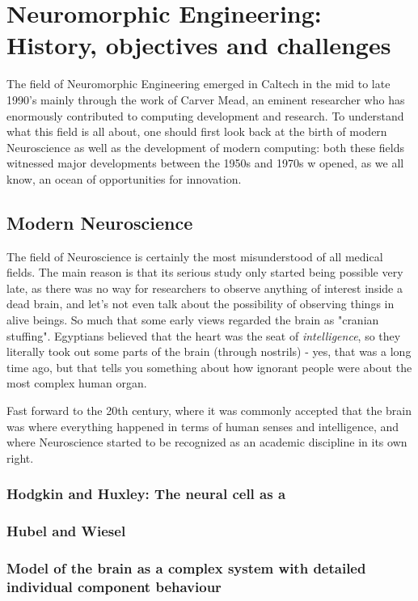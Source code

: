 \newpage
\section{Neuromorphic Engineering: History, objectives and challenges}

The field of Neuromorphic Engineering emerged in Caltech in the mid to late 1990's mainly through the work of Carver Mead, an eminent researcher who has enormously contributed to computing development and research. To understand what this field is all about, one should first look back at the birth of modern Neuroscience as well as the development of modern computing: both these fields witnessed major developments between the 1950s and 1970s w opened, as we all know, an ocean of opportunities for innovation. 

\subsection{Modern Neuroscience}

The field of Neuroscience is certainly the most misunderstood of all medical fields. The main reason is that its serious study only started being possible very late, as there was no way for researchers to observe anything of interest inside a dead brain, and let's not even talk about the possibility of observing things in alive beings. So much that some early views regarded the brain as "cranian stuffing". Egyptians believed that the heart was the seat of \textit{intelligence}, so they literally took out some parts of the brain (through nostrils) - yes, that was a long time ago, but that tells you something about how ignorant people were about the most complex human organ. 

Fast forward to the 20th century, where it was commonly accepted that the brain was where everything happened in terms of human senses and intelligence, and where Neuroscience started to be recognized as an academic discipline in its own right.

\subsubsection{Hodgkin and Huxley: The neural cell as a }
\subsubsection{Hubel and Wiesel}
\subsubsection{Model of the brain as a complex system with detailed individual component behaviour}

